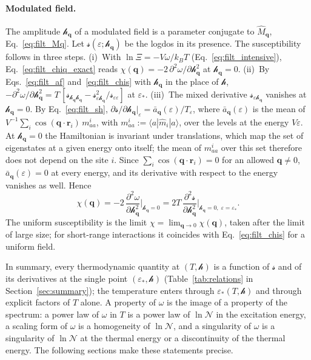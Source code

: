 \documentclass[10pt,a4paper]{article}
\theoremstyle{plain}
\newcommand{\cN}{\mathcal{N}}   %
\newcommand{\lndos}{{logdos}}  %
\newcommand{\hfield}{\mathscr{h}}  %
\newcommand{\lds}{\mathscr{s}}  %
\begin{document}
\paragraph{Modulated field.} The amplitude $\hfield_{\mathbf q}$ of a
modulated field is a parameter conjugate to $\hat M_{\mathbf q}$,
Eq.~\eqref{eq:filt_Mq}. Let $\lds(\varepsilon;\hfield_{\mathbf q})$ be the
\lndos{} in its presence. The susceptibility follows in three steps.
(i)~With $\ln\Xi=-V\omega/k_BT$ (Eq.~\eqref{eq:filt_intensive}),
Eq.~\eqref{eq:filt_chiq_exact} reads
$\chi(\mathbf q)=-2\,\partial^{2}\omega/\partial \hfield_{\mathbf q}^{2}$ at
$\hfield_{\mathbf q}=0$.
(ii)~By Eqs.~\eqref{eq:filt_af} and~\eqref{eq:filt_chis} with
$\hfield_{\mathbf q}$ in the place of $\hfield$,
$-\partial^{2}\omega/\partial\hfield_{\mathbf q}^{2}
=T\,[\lds_{\hfield_{\mathbf q}\hfield_{\mathbf q}}
-\lds_{\varepsilon\hfield_{\mathbf q}}^{2}/\lds_{\varepsilon\varepsilon}]$ at
$\varepsilon_*$.
(iii)~The mixed derivative $\lds_{\varepsilon\hfield_{\mathbf q}}$ vanishes at
$\hfield_{\mathbf q}=0$. By Eq.~\eqref{eq:filt_sh},
$\partial\lds/\partial\hfield_{\mathbf q}|_{\varepsilon}=\bar a_{\mathbf q}(\varepsilon)/T_\varepsilon$,
where $\bar a_{\mathbf q}(\varepsilon)$ is the mean of
$V^{-1}\sum_i\cos(\mathbf q\cdot\mathbf r_i)\,m^{i}_{aa}$, with
$m^{i}_{aa}:=\langle a|\hat m_i|a\rangle$, over the levels at the energy
$V\varepsilon$. At $\hfield_{\mathbf q}=0$ the Hamiltonian is invariant under
translations, which map the set of eigenstates at a given energy onto
itself; the mean of $m^{i}_{aa}$ over this set therefore does not depend on
the site $i$. Since $\sum_i\cos(\mathbf q\cdot\mathbf r_i)=0$ for an allowed
$\mathbf q\neq0$, $\bar a_{\mathbf q}(\varepsilon)=0$ at every energy, and
its derivative with respect to the energy vanishes as well. Hence
\begin{equation}\label{eq:filt_chiq}
  \chi(\mathbf q)=-2\,\frac{\partial^{2}\omega}{\partial \hfield_{\mathbf q}^{2}}
  \bigg|_{\hfield_{\mathbf q}=0}
  =2T\,\frac{\partial^{2}\lds}{\partial \hfield_{\mathbf q}^{2}}
  \bigg|_{\hfield_{\mathbf q}=0,\;\varepsilon=\varepsilon_*} .
\end{equation}
The uniform susceptibility is the limit
$\chi=\lim_{\mathbf q\to0}\chi(\mathbf q)$, taken after the limit of large
size; for short-range interactions it coincides with
Eq.~\eqref{eq:filt_chis} for a uniform field.

In summary, every thermodynamic quantity at $(T,\hfield)$ is a function of
$\lds$ and of its derivatives at the single point $(\varepsilon_*,\hfield)$
(Table~\ref{tab:relations} in Section~\ref{sec:summary}); the temperature
enters through $\varepsilon_*(T,\hfield)$ and through explicit factors of $T$
alone. A property of $\omega$ is the image of a property of the spectrum: a
power law of $\omega$ in $T$ is a power law of $\ln\cN$ in the excitation
energy, a scaling form of $\omega$ is a homogeneity of $\ln\cN$, and a
singularity of $\omega$ is a singularity of  $\ln\cN$ at the thermal energy or
a discontinuity of the thermal energy. The following sections make
these statements precise.
\end{document}
